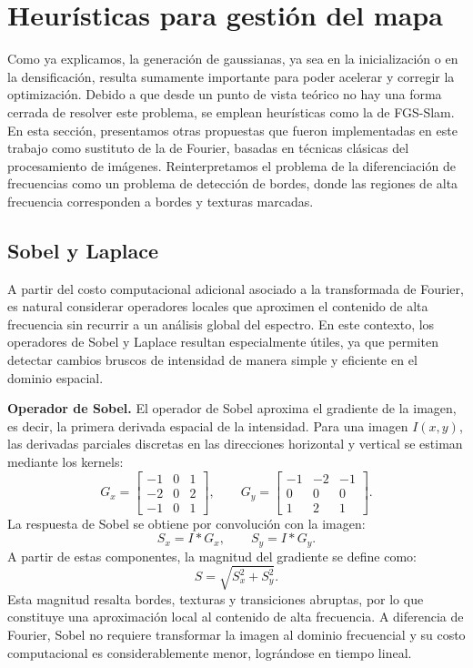 \section{Heurísticas para gestión del mapa}

Como ya explicamos, la generación de gaussianas, ya sea en la inicialización o en la densificación, resulta sumamente importante para poder acelerar y corregir la optimización. Debido a que desde un punto de vista teórico no hay una forma cerrada de resolver este problema, se emplean heurísticas como la de FGS-Slam. En esta sección, presentamos otras propuestas que fueron implementadas en este trabajo como sustituto de la de Fourier, basadas en técnicas clásicas del procesamiento de imágenes. Reinterpretamos el problema de la diferenciación de frecuencias como un problema de detección de bordes, donde las regiones de alta frecuencia corresponden a bordes y texturas marcadas.

\subsection{Sobel y Laplace}

A partir del costo computacional adicional asociado a la transformada de Fourier, es natural considerar operadores locales que aproximen el contenido de alta frecuencia sin recurrir a un análisis global del espectro. En este contexto, los operadores de Sobel y Laplace resultan especialmente útiles, ya que permiten detectar cambios bruscos de intensidad de manera simple y eficiente en el dominio espacial.

\textbf{Operador de Sobel.} El operador de Sobel aproxima el gradiente de la imagen, es decir, la primera derivada espacial de la intensidad. Para una imagen $I(x,y)$, las derivadas parciales discretas en las direcciones horizontal y vertical se estiman mediante los kernels:
\begin{equation}
G_x =
\begin{bmatrix}
-1 & 0 & 1 \\
-2 & 0 & 2 \\
-1 & 0 & 1
\end{bmatrix},
\qquad
G_y =
\begin{bmatrix}
-1 & -2 & -1 \\
0 & 0 & 0 \\
1 & 2 & 1
\end{bmatrix}.
\end{equation}
La respuesta de Sobel se obtiene por convolución con la imagen:
\begin{equation}
S_x = I * G_x, \qquad S_y = I * G_y.
\end{equation}
A partir de estas componentes, la magnitud del gradiente se define como:
\begin{equation}
S = \sqrt{S_x^2 + S_y^2}.
\end{equation}
Esta magnitud resalta bordes, texturas y transiciones abruptas, por lo que constituye una aproximación local al contenido de alta frecuencia. A diferencia de Fourier, Sobel no requiere transformar la imagen al dominio frecuencial y su costo computacional es considerablemente menor, lográndose en tiempo lineal.

